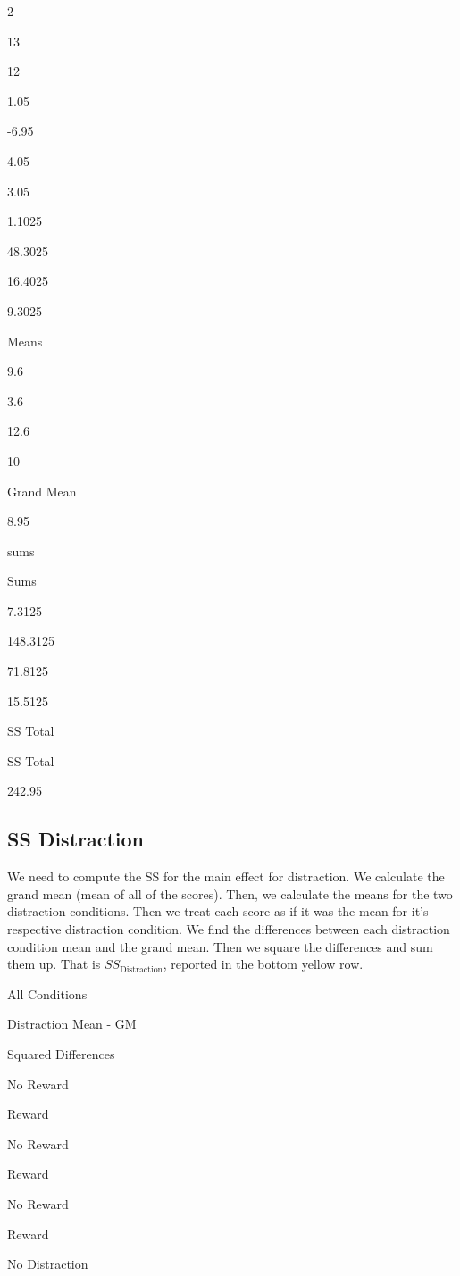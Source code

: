 \documentclass[]{book}
\begin{document}
2

13

12

1.05

-6.95

4.05

3.05

1.1025

48.3025

16.4025

9.3025

Means

9.6

3.6

12.6

10

Grand Mean

8.95

sums

Sums

7.3125

148.3125

71.8125

15.5125

SS Total

SS Total

242.95

\hypertarget{ss-distraction}{%
\subsection{SS Distraction}\label{ss-distraction}}

We need to compute the SS for the main effect for distraction. We calculate the grand mean (mean of all of the scores). Then, we calculate the means for the two distraction conditions. Then we treat each score as if it was the mean for it's respective distraction condition. We find the differences between each distraction condition mean and the grand mean. Then we square the differences and sum them up. That is \(SS_\text{Distraction}\), reported in the bottom yellow row.

All Conditions

Distraction Mean - GM

Squared Differences

No Reward

Reward

No Reward

Reward

No Reward

Reward

No Distraction
\end{document}
